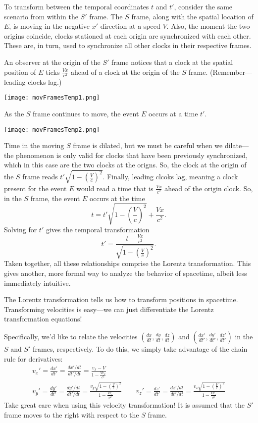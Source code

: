 \documentclass[../p023main.tex]{subfiles}
\begin{document}
To transform between the temporal coordinates $t$ and $t'$, consider the same scenario from within the $S'$ frame.
The $S$ frame, along with the spatial location of $E$, is moving in the negative $x'$ direction at a speed $V$.
Also, the moment the two origins coincide, clocks stationed at each origin are synchronized with each other.
These are, in turn, used to synchronize all other clocks in their respective frames.

An observer at the origin of the $S'$ frame notices that a clock at the spatial position of $E$ ticks $\frac{Vx}{c^2}$ ahead of a clock at the origin of the $S$ frame.
(Remember---leading clocks lag.)
\begin{center}
    \texttt{[image: movFramesTemp1.png]}
\end{center}
As the $S$ frame continues to move, the event $E$ occurs at a time $t'$.
\begin{center}
    \texttt{[image: movFramesTemp2.png]}
\end{center}
Time in the moving $S$ frame is dilated, but we must be careful when we dilate---the phenomenon is only valid for clocks that have been previously synchronized, which in this case are the two clocks at the origns.
So, the clock at the origin of the $S$ frame reads $t' \sqrt{1 - \left( \frac{V}{c} \right)^2}$.
Finally, leading clcoks lag, meaning a clock present for the event $E$ would read a time that is $\frac{Vx}{c^2}$ ahead of the origin clock.
So, in the $S$ frame, the event $E$ occurs at the time
\[ t = t' \sqrt{1 - \left( \frac{V}{c} \right)^2} + \frac{Vx}{c^2}. \]
Solving for $t'$ gives the temporal transformation
\[ t' = \frac{t - \frac{Vx}{c^2}}{\sqrt{1 - \left( \frac{V}{c} \right)^2}}. \]
Taken together, all these relationships comprise the Lorentz transformation.
This gives another, more formal way to analyze the behavior of spacetime, albeit less immediately intuitive.

The Lorentz transformation tells us how to transform positions in spacetime.
Transforming velocities is easy---we can just differentiate the Lorentz transformation equations!

Specifically, we'd like to relate the velocities $\left( \frac{dx}{dt}, \frac{dy}{dt}, \frac{dz}{dt} \right)$ and $\left( \frac{dx'}{dt'}, \frac{dy'}{dt'}, \frac{dz'}{dt'} \right)$ in the $S$ and $S'$ frames, respectively.
To do this, we simply take advantage of the chain rule for derivatives:
\begin{gather*}
    v_x' = \frac{dx'}{dt'} = \frac{dx'/dt}{dt'/dt} = \frac{v_x - V}{1 - \frac{Vv_x}{c^2}} \\
    v_y' = \frac{dy'}{dt'} = \frac{dy'/dt}{dt'/dt} = \frac{v_y\sqrt{1 - \left( \frac{V}{c} \right)^2}}{1 - \frac{Vv_x}{c^2}} \qquad
    v_z' = \frac{dz'}{dt'} = \frac{dz'/dt}{dt'/dt} = \frac{v_z\sqrt{1 - \left( \frac{V}{c} \right)^2}}{1 - \frac{Vv_z}{c^2}}
\end{gather*}
Take great care when using this velocity transformation!
It is assumed that the $S'$ frame moves to the right with respect to the $S$ frame.
\end{document}
